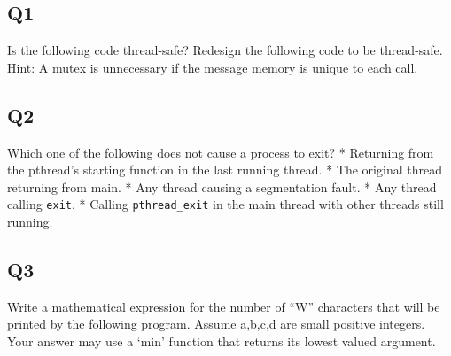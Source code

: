 \subsection{Q1}\label{q1}

Is the following code thread-safe? Redesign the following code to be
thread-safe. Hint: A mutex is unnecessary if the message memory is
unique to each call.

\begin{Shaded}
\end{Shaded}

\subsection{Q2}\label{q2}

Which one of the following does not cause a process to exit? * Returning
from the pthread's starting function in the last running thread. * The
original thread returning from main. * Any thread causing a segmentation
fault. * Any thread calling \texttt{exit}. * Calling
\texttt{pthread\_exit} in the main thread with other threads still
running.

\subsection{Q3}\label{q3}

Write a mathematical expression for the number of ``W'' characters that
will be printed by the following program. Assume a,b,c,d are small
positive integers. Your answer may use a `min' function that returns its
lowest valued argument.

